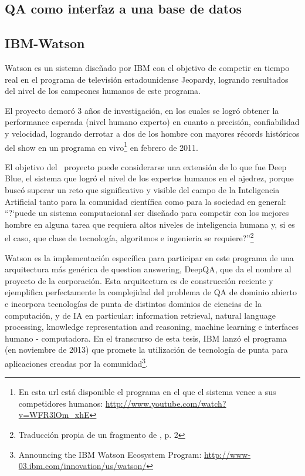 \subsection{QA como interfaz a una base de datos}
\label{subsec:closed-domain}

\subsection{IBM-Watson}
\label{subsec:ibm-watson}
Watson\cite{WATSON1}\cite{WATSON2} es un sistema diseñado por IBM con el objetivo de competir en
tiempo real en el programa de televisión estadounidense Jeopardy,
logrando resultados del nivel de los campeones humanos de este
programa.

El proyecto demoró 3 años de investigación, en los cuales se
logró obtener la performance esperada (nivel humano experto) en
cuanto a precisión, confiabilidad y velocidad, logrando derrotar a
dos de los hombre con mayores récords históricos del show en un
programa en vivo\footnote{En esta url está disponible el programa en el que el sistema vence a sus competidores humanos: \url{http://www.youtube.com/watch?v=WFR3lOm_xhE}} en febrero de 2011.

El objetivo del \ proyecto puede considerarse una extensión de lo que
fue Deep Blue, el sistema que logró el nivel de los expertos humanos
en el ajedrez, porque buscó superar un reto que significativo y
visible del campo de la Inteligencia Artificial tanto para la comunidad
científica como para la sociedad en general:
{\textquotedblleft}?`puede un sistema computacional ser diseñado para
competir con los mejores hombre en alguna tarea que requiera altos
niveles de inteligencia humana y, si es el caso, que clase de
tecnología, algoritmos e ingenieria se
requiere?{\textquotedblright}\footnote{Traducción propia de
un fragmento de \cite{WATSON1}, p. 2}

Watson es la implementación específica para participar en este
programa de una arquitectura más genérica de question answering,
DeepQA, que da el nombre al proyecto de la corporación. Esta
arquitectura es de construcción reciente y ejemplifica perfectamente la complejidad del problema de
QA de dominio abierto e incorpora tecnologías de punta de distintos
dominios de ciencias de la computación, y de IA en particular:
information retrieval, natural language processing, knowledge
representation and reasoning, machine learning e interfaces humano -
computadora. En el transcurso de esta tesis, IBM lanzó el programa
 (en noviembre de 2013) que promete la utilización
de tecnología de punta para aplicaciones creadas por la comunidad\footnote{
Announcing the IBM Watson Ecosystem Program: \url{http://www-03.ibm.com/innovation/us/watson/}}.

